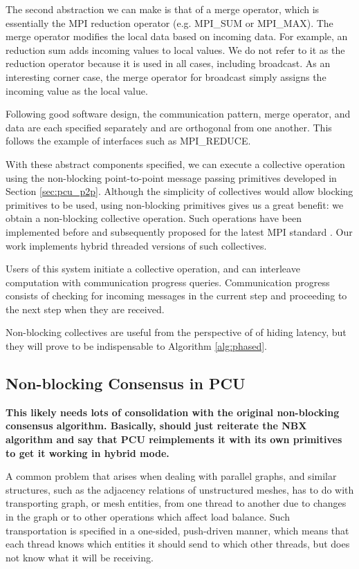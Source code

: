 The second abstraction we can make is that of a merge operator, which is
essentially the MPI reduction operator (e.g. MPI\_SUM or MPI\_MAX).
The merge operator modifies the local data based on incoming data.
For example, an reduction sum adds incoming values to local values.
We do not refer to it as the reduction operator because it is used
in all cases, including broadcast.
As an interesting corner case, the merge operator for broadcast simply
assigns the incoming value as the local value.

Following good software design, the communication pattern,
merge operator, and data are each specified separately
and are orthogonal from one another.
This follows the example of interfaces such as MPI\_REDUCE.

With these abstract components specified, we can execute a collective
operation
using the non-blocking point-to-point message passing primitives
developed in Section \ref{sec:pcu_p2p}.
Although the simplicity of collectives would allow blocking primitives
to be used, using non-blocking primitives gives us a great benefit:
we obtain a non-blocking collective operation.
Such operations have been implemented before \cite{hoefler2007implementation}
and subsequently proposed for the latest MPI standard \cite{hoefler2006non}.
Our work implements hybrid threaded versions of such collectives.

Users of this system initiate a collective operation, and can interleave
computation with communication progress queries.
Communication progress consists of checking for incoming messages in the current
step and proceeding to the next step when they are received.

Non-blocking collectives are useful from the perspective of
of hiding latency, but they will prove to be indispensable to
Algorithm \ref{alg:phased}.

\subsection{Non-blocking Consensus in PCU}
\label{sec:pcu_phased}

{\bf This likely needs lots of consolidation with the
original non-blocking consensus algorithm. Basically, should just
reiterate the NBX algorithm and say that PCU reimplements it with
its own primitives to get it working in hybrid mode.}

A common problem that arises when dealing with parallel graphs,
and similar structures, such as the adjacency relations of unstructured
meshes, has to do with transporting graph, or mesh entities, from
one thread to another
due to changes in the graph or to other operations which affect
load balance.
Such transportation is specified in a one-sided,
push-driven manner, which means that each thread knows which
entities it should send to which other threads, but does
not know what it will be receiving.

